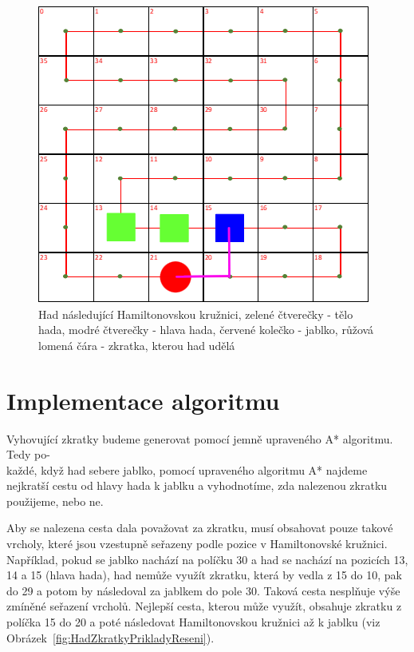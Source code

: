 \begin{figure}[H]
    \centering
    \includegraphics[width=0.8\linewidth]{Images/HadZkratkyReseni.png}
    \caption{Had následující Hamiltonovskou kružnici, zelené čtverečky - tělo hada, modré čtverečky - hlava hada, červené kolečko - jablko, růžová lomená čára - zkratka, kterou had udělá}
    \label{fig:HadZkratkyReseni}
\end{figure}

\section{Implementace algoritmu}

Vyhovující zkratky budeme generovat pomocí jemně upraveného A* algoritmu. Tedy po-\\každé, když had sebere jablko, pomocí upraveného algoritmu A* najdeme nejkratší cestu od hlavy hada k jablku a vyhodnotíme, zda nalezenou zkratku použijeme, nebo ne.

Aby se nalezena cesta dala považovat za zkratku, musí obsahovat pouze takové vrcholy, které jsou vzestupně seřazeny podle pozice v Hamiltonovské kružnici. Například, pokud se jablko nachází na políčku 30 a had se nachází na pozicích 13, 14 a 15 (hlava hada), had nemůže využít zkratku, která by vedla z 15 do 10, pak do 29 a potom by následoval za jablkem do pole 30. Taková cesta nesplňuje výše zmíněné seřazení vrcholů. Nejlepší cesta, kterou může využít, obsahuje zkratku z políčka 15 do 20 a poté následovat Hamiltonovskou kružnici až k jablku (viz Obrázek~\ref{fig:HadZkratkyPrikladyReseni}).

